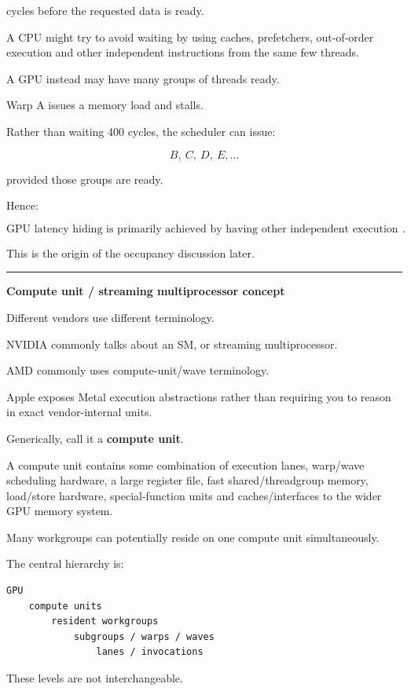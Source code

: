 cycles before the requested data is ready.

A CPU might try to avoid waiting by using caches, prefetchers, out-of-order execution and other independent instructions from the same few threads.

A GPU instead may have many groups of threads ready.

Warp A issues a memory load and stalls.

Rather than waiting 400 cycles, the scheduler can issue:

\[
B,\ C,\ D,\ E,\dots
\]

provided those groups are ready.

Hence:

\[
\boxed{
\text{GPU latency hiding is primarily achieved by having other independent execution groups resident}.
}
\]

This is the origin of the occupancy discussion later.

\begin{center}\rule{0.5\linewidth}{0.5pt}\end{center}

\textbf{Compute unit / streaming multiprocessor concept}

Different vendors use different terminology.

NVIDIA commonly talks about an SM, or streaming multiprocessor.

AMD commonly uses compute-unit/wave terminology.

Apple exposes Metal execution abstractions rather than requiring you to reason in exact vendor-internal units.

Generically, call it a \textbf{compute unit}.

A compute unit contains some combination of execution lanes, warp/wave scheduling hardware, a large register file, fast shared/threadgroup memory, load/store hardware, special-function units and caches/interfaces to the wider GPU memory system.

Many workgroups can potentially reside on one compute unit simultaneously.

The central hierarchy is:

\protect{}\label{5kw7e9}%
\begin{verbatim}
GPU
    compute units
        resident workgroups
            subgroups / warps / waves
                lanes / invocations
\end{verbatim}

These levels are not interchangeable.

